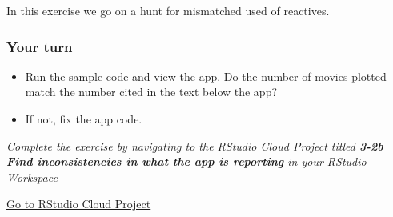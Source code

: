 \documentclass[
  letterpaper,
  DIV=11,
  numbers=noendperiod]{scrreprt}
\providecommand{\tightlist}{%
  \setlength{\itemsep}{0pt}\setlength{\parskip}{0pt}}
\begin{document}
In this exercise we go on a hunt for mismatched used of reactives.

\hypertarget{your-turn-22}{%
\subsubsection{Your turn}\label{your-turn-22}}

\begin{itemize}
\tightlist
\item
  Run the sample code and view the app. Do the number of movies plotted
  match the number cited in the text below the app?
\item
  If not, fix the app code.
\end{itemize}

\emph{Complete the exercise by navigating to the RStudio Cloud Project
titled \textbf{3-2b Find inconsistencies in what the app is reporting}
in your RStudio Workspace}

\href{https://rstudio.cloud/spaces/81721/join?access_code=I4VJaNsKfTqR3Td9hLP7E1nz8\%2FtMg6Xbw9Bgqumv}{
Go to RStudio Cloud Project}
\end{document}
